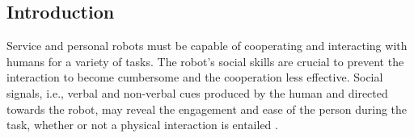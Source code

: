 





\subsection{Introduction}
Service and personal robots must be capable of cooperating and interacting with humans for a variety of tasks.
The robot's social skills are crucial to prevent the interaction to become cumbersome and the cooperation less effective.  
Social signals, i.e., verbal and non-verbal cues produced by the human and directed towards the robot, may reveal the engagement and ease of the person during the task, whether or not a physical interaction is entailed \cite{Anzalone2015engagement,ivaldi2014frontiers,Chen2014NARStouch}.

